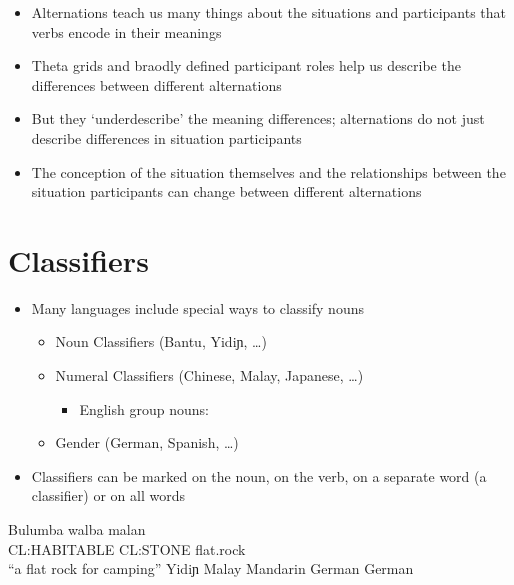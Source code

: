\documentclass[headrule,footrule]{foils}
\begin{document}
\begin{itemize}
\item Alternations teach us many things about the situations and participants that verbs encode in their meanings
\item Theta grids and braodly defined participant roles help us describe the differences between different alternations
\item But they `underdescribe' the meaning differences; alternations do not just describe differences in situation participants 
\item The conception of the situation themselves and the relationships between the situation participants can change between different alternations
\end{itemize}

\section{Classifiers}

\MyLogo{}
\begin{itemize}
\item  Many languages include special ways to classify 
nouns
\begin{itemize}
\item  Noun Classifiers (Bantu, {\ipafont Yidiɲ}, \ldots) 
\item  Numeral Classifiers (Chinese, Malay, Japanese, \ldots)
  \begin{itemize}
  \item English group nouns: 
  \end{itemize}
\item  Gender (German, Spanish, \ldots)  
\end{itemize}
\item Classifiers can be marked on the noun, on the verb, on a
  separate word (a classifier) or on all words
\end{itemize}

\begin{exe}
  \ex \gll Bulumba walba      malan \\
  CL:HABITABLE CL:STONE  flat.rock \\
  \trans ``a flat rock for camping'' \hfill {\ipafont Yidiɲ}  \citep{Dixon:1977}
  \ex {} \hfill Malay
  \ex {}  \hfill Mandarin
  \ex {} \hfill German
  \ex {}\hfill German
\end{exe}
\end{document}

